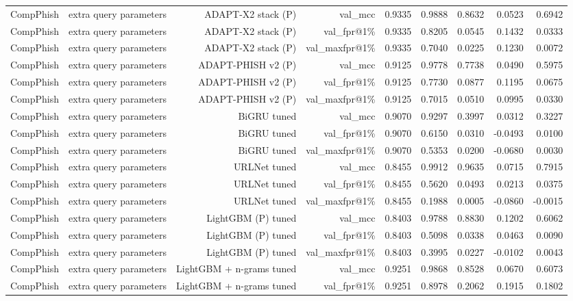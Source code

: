 \begin{table}[t]
\begin{tabular}{llrrrrrrr}
CompPhish & extra query parameters & ADAPT-X2 stack (P) & val\_mcc & 0.9335 & 0.9888 & 0.8632 & 0.0523 & 0.6942 \\
CompPhish & extra query parameters & ADAPT-X2 stack (P) & val\_fpr@1\% & 0.9335 & 0.8205 & 0.0545 & 0.1432 & 0.0333 \\
CompPhish & extra query parameters & ADAPT-X2 stack (P) & val\_maxfpr@1\% & 0.9335 & 0.7040 & 0.0225 & 0.1230 & 0.0072 \\
CompPhish & extra query parameters & ADAPT-PHISH v2 (P) & val\_mcc & 0.9125 & 0.9778 & 0.7738 & 0.0490 & 0.5975 \\
CompPhish & extra query parameters & ADAPT-PHISH v2 (P) & val\_fpr@1\% & 0.9125 & 0.7730 & 0.0877 & 0.1195 & 0.0675 \\
CompPhish & extra query parameters & ADAPT-PHISH v2 (P) & val\_maxfpr@1\% & 0.9125 & 0.7015 & 0.0510 & 0.0995 & 0.0330 \\
CompPhish & extra query parameters & BiGRU tuned & val\_mcc & 0.9070 & 0.9297 & 0.3997 & 0.0312 & 0.3227 \\
CompPhish & extra query parameters & BiGRU tuned & val\_fpr@1\% & 0.9070 & 0.6150 & 0.0310 & -0.0493 & 0.0100 \\
CompPhish & extra query parameters & BiGRU tuned & val\_maxfpr@1\% & 0.9070 & 0.5353 & 0.0200 & -0.0680 & 0.0030 \\
CompPhish & extra query parameters & URLNet tuned & val\_mcc & 0.8455 & 0.9912 & 0.9635 & 0.0715 & 0.7915 \\
CompPhish & extra query parameters & URLNet tuned & val\_fpr@1\% & 0.8455 & 0.5620 & 0.0493 & 0.0213 & 0.0375 \\
CompPhish & extra query parameters & URLNet tuned & val\_maxfpr@1\% & 0.8455 & 0.1988 & 0.0005 & -0.0860 & -0.0015 \\
CompPhish & extra query parameters & LightGBM (P) tuned & val\_mcc & 0.8403 & 0.9788 & 0.8830 & 0.1202 & 0.6062 \\
CompPhish & extra query parameters & LightGBM (P) tuned & val\_fpr@1\% & 0.8403 & 0.5098 & 0.0338 & 0.0463 & 0.0090 \\
CompPhish & extra query parameters & LightGBM (P) tuned & val\_maxfpr@1\% & 0.8403 & 0.3995 & 0.0227 & -0.0102 & 0.0043 \\
CompPhish & extra query parameters & LightGBM + n-grams tuned & val\_mcc & 0.9251 & 0.9868 & 0.8528 & 0.0670 & 0.6073 \\
CompPhish & extra query parameters & LightGBM + n-grams tuned & val\_fpr@1\% & 0.9251 & 0.8978 & 0.2062 & 0.1915 & 0.1802 \\

\end{tabular}
\end{table}
